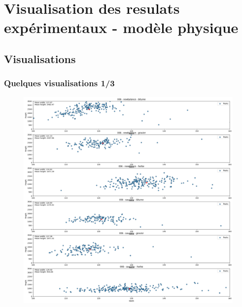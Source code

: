 \section{Visualisation des resulats expérimentaux - modèle physique}
\subsection{Visualisations}
\begin{frame}
    \frametitle{Quelques visualisations 1/3}
    \begin{figure}[!h]
        \includegraphics[scale=0.2]{./figures/res_02.png}
    \end{figure}
\end{frame}
